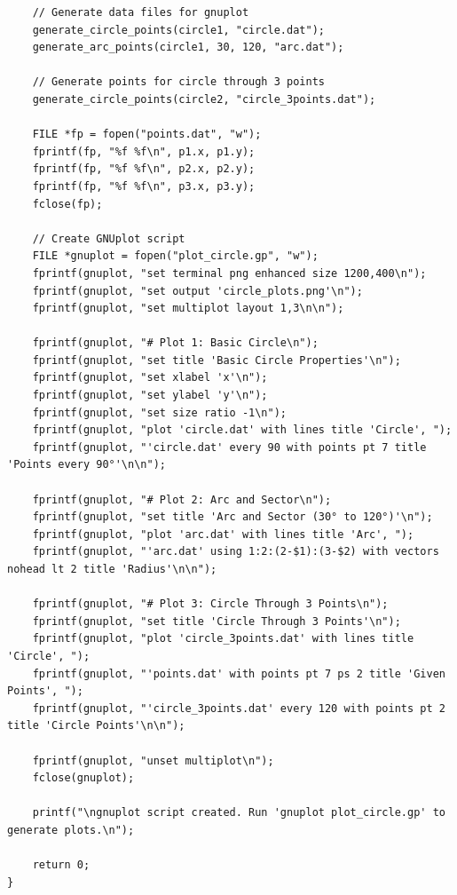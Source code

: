 \documentclass[a4paper,14pt]{article}
\begin{document}
{\begin{verbatim}
    // Generate data files for gnuplot
    generate_circle_points(circle1, "circle.dat");
    generate_arc_points(circle1, 30, 120, "arc.dat");

    // Generate points for circle through 3 points
    generate_circle_points(circle2, "circle_3points.dat");

    FILE *fp = fopen("points.dat", "w");
    fprintf(fp, "%f %f\n", p1.x, p1.y);
    fprintf(fp, "%f %f\n", p2.x, p2.y);
    fprintf(fp, "%f %f\n", p3.x, p3.y);
    fclose(fp);

    // Create GNUplot script
    FILE *gnuplot = fopen("plot_circle.gp", "w");
    fprintf(gnuplot, "set terminal png enhanced size 1200,400\n");
    fprintf(gnuplot, "set output 'circle_plots.png'\n");
    fprintf(gnuplot, "set multiplot layout 1,3\n\n");

    fprintf(gnuplot, "# Plot 1: Basic Circle\n");
    fprintf(gnuplot, "set title 'Basic Circle Properties'\n");
    fprintf(gnuplot, "set xlabel 'x'\n");
    fprintf(gnuplot, "set ylabel 'y'\n");
    fprintf(gnuplot, "set size ratio -1\n");
    fprintf(gnuplot, "plot 'circle.dat' with lines title 'Circle', ");
    fprintf(gnuplot, "'circle.dat' every 90 with points pt 7 title 'Points every 90°'\n\n");

    fprintf(gnuplot, "# Plot 2: Arc and Sector\n");
    fprintf(gnuplot, "set title 'Arc and Sector (30° to 120°)'\n");
    fprintf(gnuplot, "plot 'arc.dat' with lines title 'Arc', ");
    fprintf(gnuplot, "'arc.dat' using 1:2:(2-$1):(3-$2) with vectors nohead lt 2 title 'Radius'\n\n");

    fprintf(gnuplot, "# Plot 3: Circle Through 3 Points\n");
    fprintf(gnuplot, "set title 'Circle Through 3 Points'\n");
    fprintf(gnuplot, "plot 'circle_3points.dat' with lines title 'Circle', ");
    fprintf(gnuplot, "'points.dat' with points pt 7 ps 2 title 'Given Points', ");
    fprintf(gnuplot, "'circle_3points.dat' every 120 with points pt 2 title 'Circle Points'\n\n");

    fprintf(gnuplot, "unset multiplot\n");
    fclose(gnuplot);

    printf("\ngnuplot script created. Run 'gnuplot plot_circle.gp' to generate plots.\n");

    return 0;
}
\end{verbatim}
}
\end{document}
